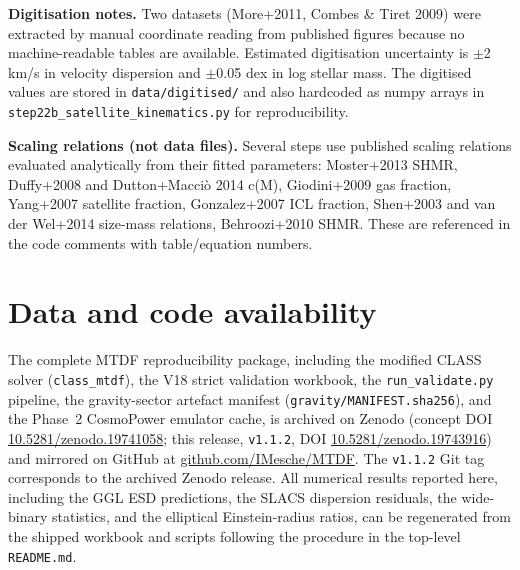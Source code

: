 \documentclass[11pt,a4paper]{article}
\begin{document}
\textbf{Digitisation notes.} Two datasets (More+2011, Combes \& Tiret 2009) were extracted by manual coordinate reading from published figures because no machine-readable tables are available. Estimated digitisation uncertainty is $\pm$2 km/\allowbreak{}s in velocity dispersion and $\pm$0.05 dex in log stellar mass. The digitised values are stored in \texttt{data/\allowbreak{}digitised/\allowbreak{}} and also hardcoded as numpy arrays in \texttt{step22b\_\allowbreak{}satellite\_\allowbreak{}kinematics.py} for reproducibility.

\textbf{Scaling relations (not data files).} Several steps use published scaling relations evaluated analytically from their fitted parameters: Moster+2013 SHMR, Duffy+2008 and Dutton+Macci\`o 2014 c(M), Giodini+2009 gas fraction, Yang+2007 satellite fraction, Gonzalez+2007 ICL fraction, Shen+2003 and van der Wel+2014 size-mass relations, Behroozi+2010 SHMR. These are referenced in the code comments with table/\allowbreak{}equation numbers.

\section{Data and code availability}
\label{sec:data-availability}
The complete MTDF reproducibility package, including the modified CLASS solver
(\texttt{class\_\allowbreak{}mtdf}), the V18 strict validation workbook, the
\texttt{run\_\allowbreak{}validate.py} pipeline, the gravity-sector artefact
manifest (\texttt{gravity/\allowbreak{}MANIFEST.sha256}), and the Phase~2
CosmoPower emulator cache, is archived on Zenodo
(concept DOI \href{https://doi.org/10.5281/zenodo.19741058}{10.5281/\allowbreak{}zenodo.\allowbreak{}19741058};
this release, \texttt{v1.1.2}, DOI
\href{https://doi.org/10.5281/zenodo.19743916}{10.5281/\allowbreak{}zenodo.\allowbreak{}19743916})
and mirrored on GitHub at
\href{https://github.com/IMesche/MTDF}{github.com/\allowbreak{}IMesche/\allowbreak{}MTDF}.
The \texttt{v1.1.2} Git tag corresponds to the archived Zenodo release. All
numerical results reported here, including the GGL ESD predictions, the
SLACS dispersion residuals, the wide-binary statistics, and the elliptical
Einstein-radius ratios, can be regenerated from the shipped workbook and
scripts following the procedure in the top-level \texttt{README.md}.
\end{document}
